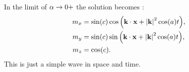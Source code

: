 In the limit of $\alpha \rightarrow 0+$ the solution becomes \cite{Fuwa2006}:
\begin{equation}
  \begin{aligned}
    m_x &= \sin(c) \cos{\left( \mathbf{k}\cdot \mathbf{x}+ \left|{\mathbf{k}} \right|^2 \cos(a) t \right)}, \\
    m_y &= \sin(c) \sin{\left( \mathbf{k}\cdot \mathbf{x}+ \left|{\mathbf{k}} \right|^2 \cos(a) t \right)}, \\
    m_z &= \cos(c).
  \end{aligned}
\end{equation}
This is just a simple wave in space and time.




